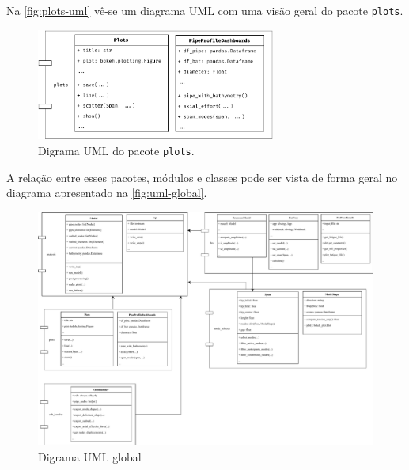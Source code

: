 Na \autoref{fig:plots-uml} vê-se um diagrama UML com uma visão geral do pacote \texttt{plots}.

\begin{figure}[!ht]
    \centering
    \caption{Digrama UML do pacote \texttt{plots}.}\label{fig:plots-uml}
    \includegraphics[width=0.7\textwidth]{imagens/plots-uml}
\end{figure}


A relação entre esses pacotes, módulos e classes pode ser vista de forma geral no diagrama apresentado na \autoref{fig:uml-global}.

\begin{landscape}
    \begin{figure}[!ht]
        \centering
        \caption{Digrama UML global}\label{fig:uml-global}
        \includegraphics[width=1.2\textwidth]{imagens/UML}
    \end{figure}
\end{landscape}